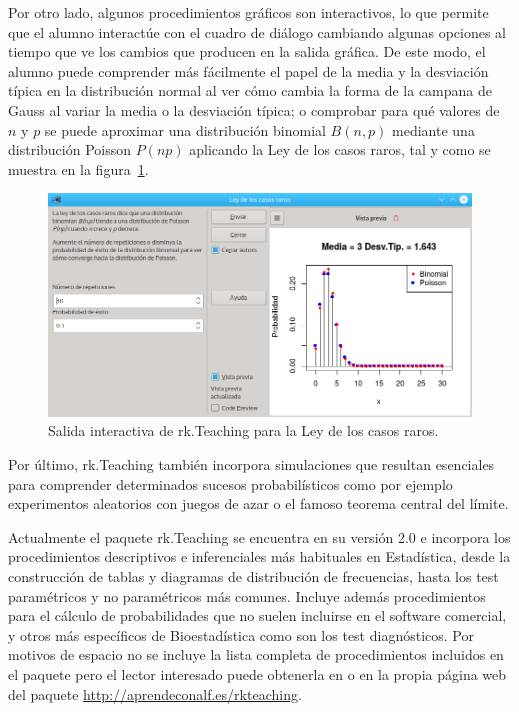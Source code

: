 \documentclass[a4paper,10pt,twoside]{article}
\newcommand{\rkteaching}{\textsf{rk.Teaching}}
\begin{document}
\begin{description}
Por otro lado, algunos procedimientos gráficos son interactivos, lo que permite que el alumno interactúe con el cuadro
de diálogo cambiando algunas opciones al tiempo que ve los cambios que producen en la salida gráfica.
De este modo, el alumno puede comprender más fácilmente el papel de la media y la desviación típica en la distribución
normal al ver cómo cambia la forma de la campana de Gauss al variar la media o la desviación
típica; o comprobar para qué valores de $n$ y $p$ se puede aproximar una distribución binomial $B(n,p)$ mediante una
distribución Poisson $P(np)$ aplicando la Ley de los casos raros, tal y como se muestra en la
figura~\ref{f:ley-casos-raros}.

\begin{figure}[htp]
\begin{center}
\includegraphics[width=\textwidth]{img/ley_casos_raros.png}
\caption{Salida interactiva de \rkteaching{} para la Ley de los casos raros.}
\label{f:ley-casos-raros}
\end{center}
\end{figure}

Por último, \rkteaching{} también incorpora simulaciones que resultan esenciales para comprender determinados sucesos
probabilísticos como por ejemplo experimentos aleatorios con juegos de azar o el famoso teorema central del límite.  
\end{description}

Actualmente el paquete \rkteaching{} se encuentra en su versión 2.0 e incorpora los procedimientos descriptivos e
inferenciales más habituales en Estadística, desde la construcción de tablas y diagramas de distribución
de frecuencias, hasta los test paramétricos y no paramétricos más comunes. 
Incluye además procedimientos para el cálculo de probabilidades que no suelen incluirse en el software comercial, y
otros más específicos de Bioestadística como son los test diagnósticos. 
Por motivos de espacio no se incluye la lista completa de procedimientos incluidos en el paquete pero el lector
interesado puede obtenerla en \cite{sanchez2015bringing} o en la propia página web del paquete
\url{http://aprendeconalf.es/rkteaching}.
\end{document}
